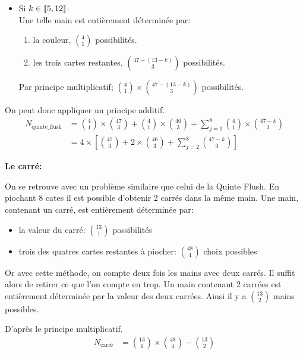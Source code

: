 \documentclass[10pt]{report}
\begin{document}
\begin{description}
\begin{itemize}
            \item Si $k \in [\![5, \space 12]\!]$: \\
            Une telle main est entièrement déterminée par:
            \begin{enumerate}
                \item la couleur, \(\binom{4}{1}\) possibilités.
                \item les trois cartes restantes, \(\binom{47 - (13 -k)}{3}\) 
                possibilités.
            \end{enumerate}
            Par principe multiplicatif; 
            $\binom{4}{1} \times \binom{47 - (13-k)}{3}$ possibilités.

        \end{itemize}
        
        On peut donc appliquer un principe additif.
        \begin{align*}
            N_\text{quinte\_flush} &= \binom{4}{1} \times \binom{47}{3} 
            + \binom{4}{1} \times \binom{46}{3} 
            + \sum_{j=1}^{8}\binom{4}{1} \times \binom{47 - k}{3}  \\
            &= 4 \times \left[\binom{47}{3} + 2 \times \binom{46}{3} 
            + \sum_{j=2}^{8}\binom{47 - k}{3} \right]
        \end{align*}

        \item \textbf{Le carré:}
        
        On se retrouve avec un problème similaire que celui de la Quinte Flush.
        En piochant 8 cates il est possible d'obtenir 2 carrés dans la même main.
        Une main, contenant un carré, est entièrement déterminée par:

        \begin{itemize}
            \item la valeur du carré: $\binom{13}{1}$ possibilités
            \item trois des quatres cartes restantes à piocher: 
            $\binom{48}{4}$ choix possibles
        \end{itemize}
        Or avec cette méthode, on compte deux fois les mains avec deux carrés.
        Il suffit alors de retirer ce que l'on compte en trop.
        Un main contenant 2 carrées est entièrement déterminée par la valeur
        des deux carrées. Ainsi il y a $\binom{13}{2}$ mains possibles.
        
        D'après le principe multiplicatif.
        \begin{align*}
            N_\text{carré} &= \binom{13}{1} \times \binom{48}{4}
            - \binom{13}{2}
        \end{align*}


\end{description}
\end{document}
